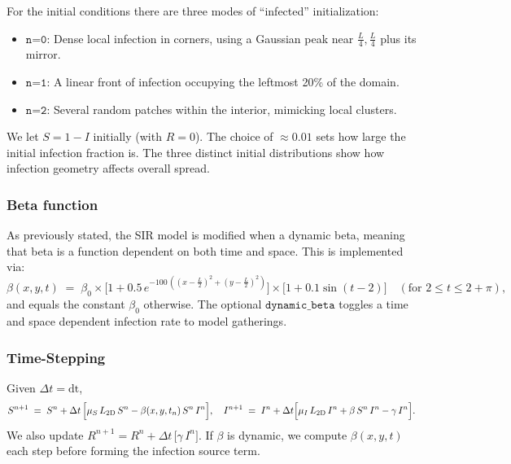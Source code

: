 For the initial conditions there are three modes of “infected” initialization:
\begin{itemize}
  \item \(\texttt{n=0}\): Dense local infection in corners, using a Gaussian peak near \(\tfrac{L}{4},\tfrac{L}{4}\) plus its mirror.
  \item \(\texttt{n=1}\): A linear front of infection occupying the leftmost 20\% of the domain.
  \item \(\texttt{n=2}\): Several random patches within the interior, mimicking local clusters.
\end{itemize}
We let \(S=1 - I\) initially (with \(R=0\)).  The choice of \( \approx 0.01\) sets how large the initial 
infection fraction is. The three distinct initial distributions show how infection geometry affects overall spread. 

\subsubsection{Beta function}
As previously stated, the SIR model is modified when a dynamic beta, meaning that beta is a function dependent on 
both time and space. This is implemented via:
\[
  \beta(x,y,t) 
  \;=\; \beta_0 \times \bigl[1 + 0.5\,e^{-100\,((x-\tfrac{L}{2})^2 + (y-\tfrac{L}{2})^2)}\bigr]
  \times \bigl[1 + 0.1 \sin(t-2)\bigr]\quad (\text{for }2\le t \le 2+\pi),
\]
and equals the constant \(\beta_0\) otherwise. The optional \(\texttt{dynamic\_beta}\) toggles a 
time and space dependent infection rate to model gatherings.

\subsubsection{Time-Stepping}
Given \(\Delta t=\text{dt}\),
\[
  S^{n+1} 
  \;=\;
  S^n + \Delta t\,\Bigl[\mu_S\,L_{\text{2D}}\,S^n - \beta(x,y,t_n)\,S^n\,I^n\Bigr],
  \quad
  I^{n+1}
  \;=\;
  I^n + \Delta t\Bigl[\mu_I\,L_{\text{2D}}\,I^n + \beta\,S^n\,I^n - \gamma\,I^n\Bigr].
\]
We also update 
\(
  R^{n+1} = R^n + \Delta t\,\bigl[\gamma\,I^n\bigr].
\)
If \(\beta\) is dynamic, we compute \(\beta(x,y,t)\) each step before forming the infection source term.


